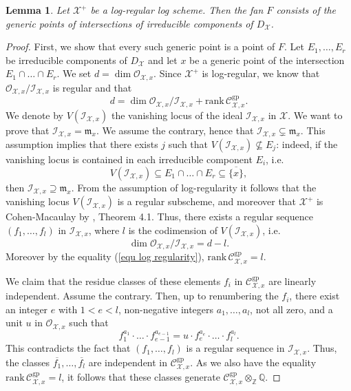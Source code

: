 \documentclass{amsart}%
\numberwithin{equation}{subsection}
\theoremstyle{plain2}
\newtheorem{lemma}[equation]{Lemma}
\theoremstyle{definition2}
\theoremstyle{stepstyle}
\theoremstyle{point}
\theoremstyle{subpoint}
\newcommand{\Z}{\ensuremath{\mathbb{Z}}}
\newcommand{\Q}{\ensuremath{\mathbb{Q}}}
\newcommand{\cX}{\ensuremath{\mathscr{X}}}
\newcommand{\caC}{\ensuremath{\mathcal{C}}}
\newcommand{\caI}{\ensuremath{\mathcal{I}}}
\newcommand{\gp}{\mathrm{gp}}
\begin{document}
\begin{lemma} \label{lemma points Kato fan}
Let $\cX^+$ be a log-regular log scheme. Then the fan $F$ consists of the generic points of intersections of irreducible components of $D_{\cX}$.
\end{lemma}
\begin{proof}
First, we show that every such generic point is a point of $F$. Let $E_1,\ldots,E_r$ be irreducible components of $D_{\cX}$ and let $x$ be a generic point of the intersection $E_1\cap\ldots\cap E_r$. We set $d=\dim \mathcal{O}_{\cX,x}$. Since $\cX^+$ is log-regular, we know that $\mathcal{O}_{\cX,x}/\mathcal{I}_{\cX,x}$ is regular and that \begin{equation} \label{equ log regularity}
d=\dim \mathcal{O}_{\cX,x}/\mathcal{I}_{\cX,x}+\mathrm{rank}\,\mathcal{C}^{\gp}_{\cX,x}.\end{equation} We denote by $V(\caI_{\cX,x})$ the vanishing locus of the ideal $\caI_{\cX,x}$ in $\cX$.
We want to prove that $\caI_{\cX,x}= \mathfrak{m}_x$. We assume the contrary, hence that $\caI_{\cX,x} \subsetneq \mathfrak{m}_x$. This assumption implies that there exists $j$ such that $V(\caI_{\cX,x}) \nsubseteq E_j$: indeed, if the vanishing locus is contained in each irreducible component $E_i$, i.e. $$V(\caI_{\cX,x}) \subseteq E_1 \cap \ldots \cap E_r \subseteq \overline{\{x\}},$$ then $\caI_{\cX,x} \supseteq \mathfrak{m}_x$. From the assumption of log-regularity it follows that the vanishing locus $V(\caI_{\cX,x})$ is a regular subscheme, and moreover that $\cX^+$ is Cohen-Macaulay by \cite{Kato1994a}, Theorem 4.1. Thus, there exists a regular sequence $(f_1,\ldots,f_l)$ in $\caI_{\cX,x}$, where $l$ is the codimension of $V(\caI_{\cX,x})$, i.e. $$ \dim \mathcal{O}_{\cX,x}/\mathcal{I}_{\cX,x} = d-l.$$ Moreover by the equality (\ref{equ log regularity}), $\mathrm{rank}\,\mathcal{C}^{\gp}_{\cX,x} = l$.
 
We claim that the residue classes of these elements $f_i$ in $\mathcal{C}_{\cX,x}^{\gp}$ are linearly independent. Assume the contrary. Then, up to renumbering the $f_i$, there exist an  integer $e$ with $1< e< l$, non-negative integers $a_1,\ldots,a_l$, not all zero, and a unit $u$ in $\mathcal{O}_{\cX,x}$ such that $$f_1^{a_1}\cdot \ldots \cdot f_{e-1}^{a_{e-1}}=u\cdot f_e^{a_e}\cdot \ldots \cdot f_l^{a_l}.$$ This contradicts the fact that $(f_1,\ldots,f_l)$ is a regular sequence in $\mathcal{I}_{\cX,x}$. Thus, the classes $\overline{f_1}, \ldots,\overline{f_l}$ are independent in $\caC_{\cX,x}^\gp$. As we also have the equality $\mathrm{rank}\,\mathcal{C}^{\gp}_{\cX,x}=l$, it follows that these classes generate $\caC_{\cX,x}^\gp \otimes_{\Z} \Q$.


\end{proof}
\end{document}
